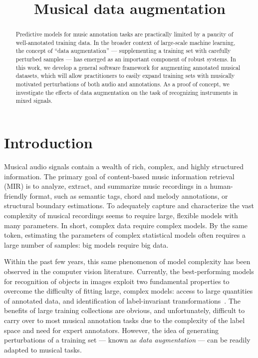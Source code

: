 \documentclass{article}
\title{Musical data augmentation}
\begin{document}
%
\maketitle
%
\begin{abstract}
Predictive models for music annotation tasks are practically limited by a paucity of
well-annotated training data.
In the broader context of large-scale machine learning, the concept of ``data
augmentation'' --- supplementing a training set with carefully perturbed samples ---
has emerged as an important component of robust systems.
In this work, we develop a general software framework for augmenting annotated 
musical datasets, which will allow practitioners to easily expand training sets 
with musically motivated perturbations of both audio and annotations.
As a proof of concept, we investigate the effects of data augmentation on 
the task of recognizing instruments in mixed signals.
\end{abstract}
%
\section{Introduction}
\label{sec:introduction}


Musical audio signals contain a wealth of rich, complex, and highly structured
information.  The primary goal of content-based music information retrieval (MIR) is to
analyze, extract, and summarize music recordings in a human-friendly
format, such as semantic tags, chord and melody annotations, or structural boundary
estimations.  To adequately capture and characterize the vast complexity of musical
recordings seems to require large, flexible models with many parameters.  
In short, complex data require complex models.
By the same token, estimating the parameters of complex statistical models often requires
a large number of samples: big models require big data.

Within the past few years, this same phenomenon of model complexity has been observed 
in the computer vision literature.  Currently, the best-performing models for recognition 
of objects in images exploit two fundamental properties to overcome the difficulty of 
fitting large, complex models: access to large quantities of annotated data, and 
identification of label-invariant transformations~\cite{krizhevsky2012imagenet}.
The benefits of large training collections are obvious, and unfortunately, difficult to 
carry over to most musical annotation tasks due to the complexity of the label space and
need for expert annotators.  However, the idea of generating perturbations of a training
set --- known as \emph{data augmentation} --- can be readily adapted to musical tasks.
\end{document}
